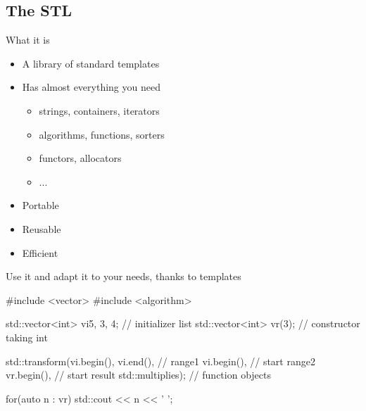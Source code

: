 \subsection[STL]{The STL}

\begin{frame}[fragile]
  \begin{block}{What it is}
    \begin{itemize}
    \item A library of standard templates
    \item Has almost everything you need
      \begin{itemize}
      \item strings, containers, iterators
      \item algorithms, functions, sorters
      \item functors, allocators
      \item ...
      \end{itemize}
    \item Portable
    \item Reusable
    \item Efficient
    \end{itemize}
  \end{block}
  \pause
  \begin{exampleblock}{Use it}
    and adapt it to your needs, thanks to templates
  \end{exampleblock}
\end{frame}

\begin{frame}[fragile]
  \begin{cppcode*}{}
    #include <vector>
    #include <algorithm>

    std::vector<int> vi{5, 3, 4}; // initializer list
    std::vector<int> vr(3); // constructor taking int

    std::transform(vi.begin(), vi.end(),      // range1
                   vi.begin(),          // start range2
                   vr.begin(),          // start result
                   std::multiplies{}); // function objects

    for(auto n : vr) {
      std::cout << n << ' ';
    }
  \end{cppcode*}
\end{frame}

